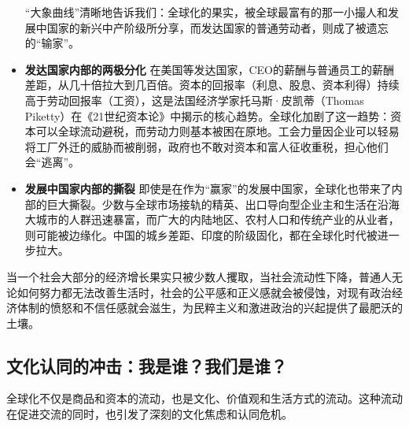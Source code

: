 \begin{itemize}
“大象曲线”清晰地告诉我们：全球化的果实，被全球最富有的那一小撮人和发展中国家的新兴中产阶级所分享，而发达国家的普通劳动者，则成了被遗忘的“输家”。

\item \textbf{发达国家内部的两极分化}
在美国等发达国家，CEO的薪酬与普通员工的薪酬差距，从几十倍拉大到几百倍。资本的回报率（利息、股息、资本利得）持续高于劳动回报率（工资），这是法国经济学家托马斯·皮凯蒂（Thomas Piketty）在《21世纪资本论》中揭示的核心趋势。全球化加剧了这一趋势：资本可以全球流动避税，而劳动力则基本被困在原地。工会力量因企业可以轻易将工厂外迁的威胁而被削弱，政府也不敢对资本和富人征收重税，担心他们会“逃离”。

\item \textbf{发展中国家内部的撕裂}
即使是在作为“赢家”的发展中国家，全球化也带来了内部的巨大撕裂。少数与全球市场接轨的精英、出口导向型企业主和生活在沿海大城市的人群迅速暴富，而广大的内陆地区、农村人口和传统产业的从业者，则可能被边缘化。中国的城乡差距、印度的阶级固化，都在全球化时代被进一步拉大。
\end{itemize}

当一个社会大部分的经济增长果实只被少数人攫取，当社会流动性下降，普通人无论如何努力都无法改善生活时，社会的公平感和正义感就会被侵蚀，对现有政治经济体制的愤怒和不信任感就会滋生，为民粹主义和激进政治的兴起提供了最肥沃的土壤。

\subsection{文化认同的冲击：我是谁？我们是谁？}

全球化不仅是商品和资本的流动，也是文化、价值观和生活方式的流动。这种流动在促进交流的同时，也引发了深刻的文化焦虑和认同危机。

